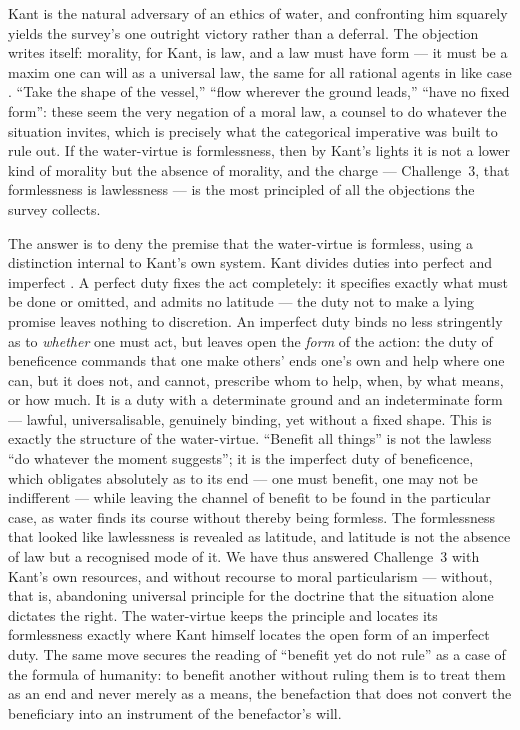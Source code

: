 Kant is the natural adversary of an ethics of water, and confronting him squarely yields the survey's one outright victory rather than a deferral. The objection writes itself: morality, for Kant, is law, and a law must have form --- it must be a maxim one can will as a universal law, the same for all rational agents in like case \parencite{kant1998}. ``Take the shape of the vessel,'' ``flow wherever the ground leads,'' ``have no fixed form'': these seem the very negation of a moral law, a counsel to do whatever the situation invites, which is precisely what the categorical imperative was built to rule out. If the water-virtue is formlessness, then by Kant's lights it is not a lower kind of morality but the absence of morality, and the charge --- Challenge~3, that formlessness is lawlessness --- is the most principled of all the objections the survey collects.

The answer is to deny the premise that the water-virtue is formless, using a distinction internal to Kant's own system. Kant divides duties into perfect and imperfect \parencite{kant1996}. A perfect duty fixes the act completely: it specifies exactly what must be done or omitted, and admits no latitude --- the duty not to make a lying promise leaves nothing to discretion. An imperfect duty binds no less stringently as to \emph{whether} one must act, but leaves open the \emph{form} of the action: the duty of beneficence commands that one make others' ends one's own and help where one can, but it does not, and cannot, prescribe whom to help, when, by what means, or how much. It is a duty with a determinate ground and an indeterminate form --- lawful, universalisable, genuinely binding, yet without a fixed shape. This is exactly the structure of the water-virtue. ``Benefit all things'' is not the lawless ``do whatever the moment suggests''; it is the imperfect duty of beneficence, which obligates absolutely as to its end --- one must benefit, one may not be indifferent --- while leaving the channel of benefit to be found in the particular case, as water finds its course without thereby being formless. The formlessness that looked like lawlessness is revealed as latitude, and latitude is not the absence of law but a recognised mode of it. We have thus answered Challenge~3 with Kant's own resources, and without recourse to moral particularism --- without, that is, abandoning universal principle for the doctrine that the situation alone dictates the right. The water-virtue keeps the principle and locates its formlessness exactly where Kant himself locates the open form of an imperfect duty. The same move secures the reading of ``benefit yet do not rule'' as a case of the formula of humanity: to benefit another without ruling them is to treat them as an end and never merely as a means, the benefaction that does not convert the beneficiary into an instrument of the benefactor's will.

